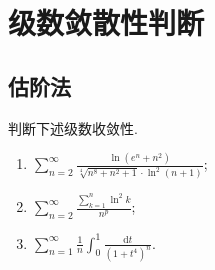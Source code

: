 \documentclass[../../main.tex]{subfiles}%
\begin{document}
\section{级数敛散性判断}

\subsection{估阶法}

\begin{example}
判断下述级数收敛性.
\begin{enumerate}
\item \( \sum_{n = 2}^{\infty} \frac{\ln \left( e^n + n^2 \right)}{\sqrt[4]{n^8 + n^2 + 1} \cdot \ln^2 (n + 1)} \);

\item \( \sum_{n = 2}^{\infty} \frac{\sum\limits_{k = 1}^{n} \ln^2 k}{n^p} \);

\item \( \sum_{n = 1}^{\infty} \frac{1}{n} \int_{0}^{1} \frac{\mathrm{d}t}{\left( 1 + t^4 \right)^n} \).
\end{enumerate}
\end{example}
\end{document}
